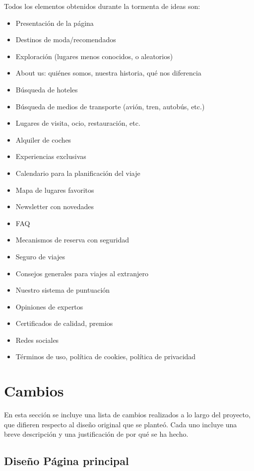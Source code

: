 \documentclass[11pt, a4paper]{book}
\begin{document}
	Todos los elementos obtenidos durante la tormenta de ideas son:
	
	\begin{itemize}
		\item Presentación de la página
		\item Destinos de moda/recomendados
		\item Exploración (lugares menos conocidos, o aleatorios)
		\item About us: quiénes somos, nuestra historia, qué nos diferencia
		\item Búsqueda de hoteles
		\item Búsqueda de medios de transporte (avión, tren, autobús, etc.)
		\item Lugares de visita, ocio, restauración, etc.
		\item Alquiler de coches
		\item Experiencias exclusivas
		\item Calendario para la planificación del viaje
		\item Mapa de lugares favoritos
		\item Newsletter con novedades
		\item FAQ
		\item Mecanismos de reserva con seguridad
		\item Seguro de viajes
		\item Consejos generales para viajes al extranjero
		\item Nuestro sistema de puntuación
		\item Opiniones de expertos
		\item Certificados de calidad, premios
		\item Redes sociales
		\item Términos de uso, política de cookies, política de privacidad
	\end{itemize}


	\section{Cambios}
	\label{sect:anexo2}
	En esta sección se incluye una lista de cambios realizados a lo largo del proyecto, que difieren respecto al diseño original que se planteó. Cada uno incluye una breve descripción y una justificación de por qué se ha hecho.
	
	\subsection{Diseño Página principal}
	
\end{document}
